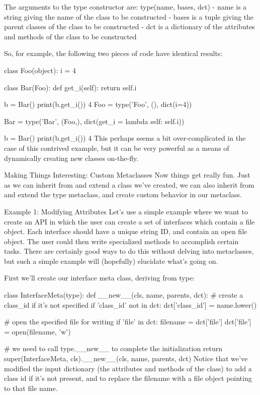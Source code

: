 The arguments to the type constructor are: type(name, bases, dct) - name is a string giving the name of the class to be constructed - bases is a tuple giving the parent classes of the class to be constructed - dct is a dictionary of the attributes and methods of the class to be constructed

So, for example, the following two pieces of code have identical results:

class Foo(object):
    i = 4

class Bar(Foo):
    def get_i(self):
        return self.i

b = Bar()
print(b.get_i())
4
Foo = type('Foo', (), dict(i=4))

Bar = type('Bar', (Foo,), dict(get_i = lambda self: self.i))

b = Bar()
print(b.get_i())
4
This perhaps seems a bit over-complicated in the case of this contrived example, but it can be very powerful as a means of dynamically creating new classes on-the-fly.

Making Things Interesting: Custom Metaclasses
Now things get really fun. Just as we can inherit from and extend a class we've created, we can also inherit from and extend the type metaclass, and create custom behavior in our metaclass.

Example 1: Modifying Attributes
Let's use a simple example where we want to create an API in which the user can create a set of interfaces which contain a file object. Each interface should have a unique string ID, and contain an open file object. The user could then write specialized methods to accomplish certain tasks. There are certainly good ways to do this without delving into metaclasses, but such a simple example will (hopefully) elucidate what's going on.

First we'll create our interface meta class, deriving from type:

class InterfaceMeta(type):
    def __new__(cls, name, parents, dct):
        # create a class_id if it's not specified
        if 'class_id' not in dct:
            dct['class_id'] = name.lower()

        # open the specified file for writing
        if 'file' in dct:
            filename = dct['file']
            dct['file'] = open(filename, 'w')

        # we need to call type.__new__ to complete the initialization
        return super(InterfaceMeta, cls).__new__(cls, name, parents, dct)
Notice that we've modified the input dictionary (the attributes and methods of the class) to add a class id if it's not present, and to replace the filename with a file object pointing to that file name.

